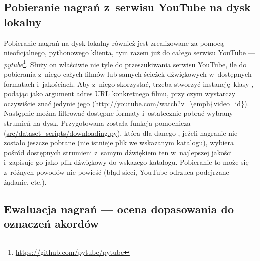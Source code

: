 \subsection{Pobieranie nagrań z~serwisu YouTube na dysk lokalny}

Pobieranie nagrań na dysk lokalny również jest zrealizowane za pomocą nieoficjalnego, pythonowego klienta, tym razem już do całego serwisu YouTube --- \emph{pytube}\footnote{\url{https://github.com/pytube/pytube}}. Służy on właściwie nie tyle do przeszukiwania serwisu YouTube, ile do pobierania z~niego całych filmów lub samych ścieżek dźwiękowych w~dostępnych formatach i~jakościach. Aby z~niego skorzystać, trzeba stworzyć instancję klasy , podając jako argument adres URL konkretnego filmu, przy czym wystarczy oczywiście znać jedynie jego  (\url{http://youtube.com/watch?v=\emph{video_id}}). Następnie można filtrować dostępne formaty i~ostatecznie pobrać wybrany strumień na dysk. Przygotowana została funkcja pomocnicza (\url{src/dataset_scripts/downloading.py}), która dla danego , jeżeli nagranie nie zostało jeszcze pobrane (nie istnieje plik we wskazanym katalogu), wybiera pośród dostępnych strumieni z~samym dźwiękiem ten w~najlepszej jakości i~zapisuje go jako plik dźwiękowy do wskazego katalogu. Pobieranie to może się z~różnych powodów nie powieść (błąd sieci, YouTube odrzuca podejrzane żądanie, etc.).

\subsection{Ewaluacja nagrań --- ocena dopasowania do oznaczeń akordów}

